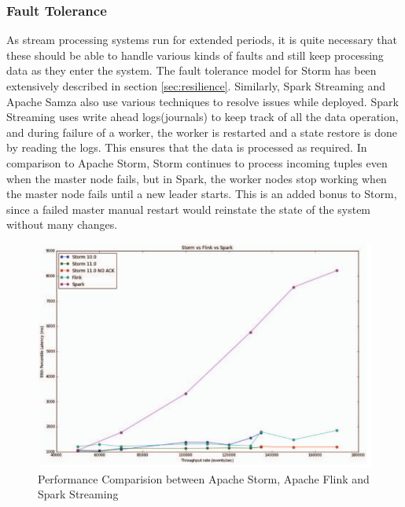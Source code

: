 \documentclass[runningheads,a4paper]{llncs}[2015/06/24]
\begin{document}
 \subsubsection{Fault Tolerance}
As stream processing systems run for extended periods, it is quite necessary that these should be able to handle various kinds of faults and still keep processing data as they enter the system. The fault tolerance model for Storm has been extensively described in section \ref{sec:resilience}. Similarly, Spark Streaming and Apache Samza also use various techniques to resolve issues while deployed. Spark Streaming uses write ahead logs(journals) to keep track of all the data operation, and during failure of a worker, the worker is restarted and a state restore is done by reading the logs. This ensures that the data is processed as required. In comparison to Apache Storm, Storm continues to process incoming tuples even when the master node fails, but in Spark, the worker nodes stop working when the master node fails until a new leader starts. This is an added bonus to Storm, since a failed master manual restart would reinstate the state of the system without many changes.

\begin{figure}
\begin{center}
\includegraphics[width=.75 \textwidth]{comparisiongraph.png}
\caption{Performance Comparision between Apache Storm, Apache Flink and Spark Streaming \cite{benchmark}}
\label{fig:comparisiongraph}
\end{center}
\end{figure}
 
\end{document}
